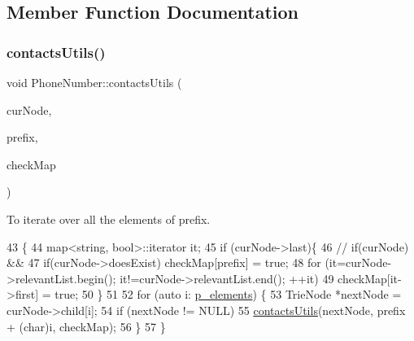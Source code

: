 \subsection{Member Function Documentation}
\mbox{\label{class_phone_number_a8ccd9871c68caa6d5b5b8f915d7b2567}} 
\subsubsection{\texorpdfstring{contacts\+Utils()}{contactsUtils()}}
{\footnotesize\ttfamily void Phone\+Number\+::contacts\+Utils (\begin{DoxyParamCaption}\item[{Trie\+Node $\ast$}]{cur\+Node,  }\item[{string}]{prefix,  }\item[{map$<$ string, bool $>$ \&}]{check\+Map }\end{DoxyParamCaption})}



To iterate over all the elements of prefix. 


\begin{DoxyCode}
43                                                                                              \{
44     map<string, bool>::iterator it;
45     \textcolor{keywordflow}{if} (curNode->last)\{
46         \textcolor{comment}{// if(curNode) && }
47         \textcolor{keywordflow}{if}(curNode->doesExist) checkMap[prefix] = \textcolor{keyword}{true};
48         \textcolor{keywordflow}{for} (it=curNode->relevantList.begin(); it!=curNode->relevantList.end(); ++it)
49             checkMap[it->first] = \textcolor{keyword}{true};
50     \}
51  
52     \textcolor{keywordflow}{for} (\textcolor{keyword}{auto} i: \hyperlink{utilities_8h_ab4cb01cee97b1625dadb96088dc7aad0}{p\_elements}) \{
53         TrieNode *nextNode = curNode->child[i];
54         \textcolor{keywordflow}{if} (nextNode != NULL)
55             \hyperlink{class_phone_number_a8ccd9871c68caa6d5b5b8f915d7b2567}{contactsUtils}(nextNode, prefix + (\textcolor{keywordtype}{char})i, checkMap);        
56     \}
57 \}
\end{DoxyCode}
\mbox{\label{class_phone_number_a0aefa75c9d4542be0ca256c798706732}} 
